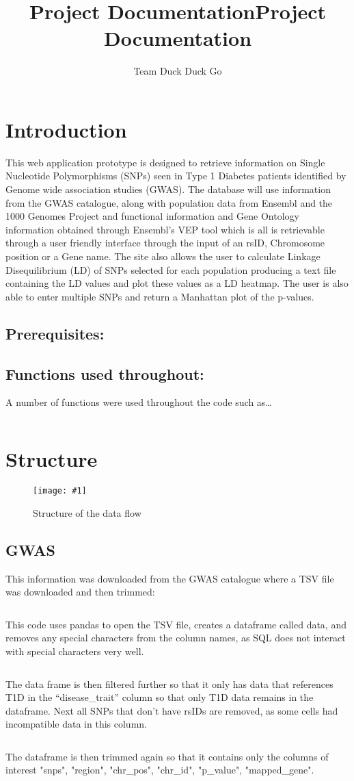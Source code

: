 \documentclass[12pt,a4paper]{article}
\title{Project Documentation}
\title{\huge \textbf{Project Documentation}}
\author{Team Duck Duck Go}
\date{} 					%
\newcommand{\mintfile}[1]{
\begin{tcolorbox}[colback=gray!5!white,%
	grow to left by=20mm,
    grow to right by=20mm,
    sharp corners]{{    \small \inputminted[breaklines]{python}{#1}		}}
\end{tcolorbox}}
\newcommand{\sect}[1]{
\FloatBarrier %
\hypertarget{#1}{
\section{#1}\label{#1}}
}
\newcommand{\subsect}[1]{
\hypertarget{#1}{
\subsection{#1}\label{#1}}
}
\newcommand{\subsubsect}[1]{
\hypertarget{#1}{
\subsection{#1}\label{#1}}
}
\newcommand{\pic}[2]{
\begin{figure}[h]
    \centering
    \captionsetup{justification=centering}
    \texttt{[image: \#1]}
    \caption{#2}
    \label{#1}
\end{figure}
}
\begin{document}
\maketitle
\thispagestyle{empty}
\clearpage
\tableofcontents
\clearpage

\sect{Introduction}


This web application prototype is designed to retrieve information on
Single Nucleotide Polymorphisms (SNPs) seen in Type 1 Diabetes patients
identified by Genome wide association studies (GWAS). The database will
use information from the GWAS catalogue, along with population data from
Ensembl and the 1000 Genomes Project and functional information and Gene
Ontology information obtained through Ensembl's VEP tool which is all is
retrievable through a user friendly interface through the input of an
rsID, Chromosome position or a Gene name. The site also allows the user
to calculate Linkage Disequilibrium (LD) of SNPs selected for each
population producing a text file containing the LD values and plot these
values as a LD heatmap. The user is also able to enter multiple SNPs and
return a Manhattan plot of the p-values.

\subsect{Prerequisites:}


\subsubsect{Functions used throughout:}

A number of functions were used throughout the code such as\ldots{}

\mintfile{code_snippets/placeholder.py}

\sect{Structure}
\pic{structure}{Structure of the data flow}

\subsect{GWAS}

This information was downloaded from the GWAS catalogue where a TSV file was downloaded and then trimmed:

\mintfile{code_snippets/placeholder.py}
This code uses pandas to open the TSV file, creates a dataframe called data, and removes any special characters from the column names, as SQL does not interact with special characters very well.

\mintfile{code_snippets/placeholder.py}
The data frame is then filtered further so that it only has data that references T1D in the “disease\_trait” column so that only T1D data remains in the dataframe. Next all SNPs that don't have rsIDs are removed, as some cells had incompatible data in this column.

\mintfile{code_snippets/placeholder.py}
The dataframe is then trimmed again so that it contains only the columns of interest   "snps", "region", "chr\_pos", "chr\_id", "p\_value", "mapped\_gene".
\end{document}
